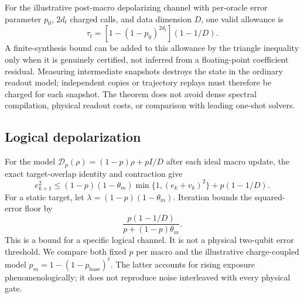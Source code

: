 \documentclass{ieeeaccess}
\begin{document}
For the illustrative post-macro depolarizing channel with per-oracle
error parameter $p_0$, $2d_t$ charged calls, and data dimension $D$,
one valid allowance is
\begin{equation}\label{eq:macroerrallowance}
\tau_t=\left[1-(1-p_0)^{2d_t}\right](1-1/D).
\end{equation}
A finite-synthesis bound can be added to this allowance by the triangle
inequality only when it is genuinely certified, not inferred from a
floating-point coefficient residual. Measuring intermediate snapshots
destroys the state in the ordinary readout model; independent copies
or trajectory replays must therefore be charged for each snapshot.
The theorem does not avoid dense spectral compilation, physical
readout costs, or comparison with leading one-shot solvers.

\subsection{Logical depolarization}
For the model $\mathcal D_p(\rho)=(1-p)\rho+pI/D$ after each ideal macro update, the exact target-overlap identity and contraction give
\begin{equation}\label{eq:noise}
e_{k+1}^2\le(1-p)(1-\theta_m)\min\{1,(e_k+v_k)^2\}+p(1-1/D).
\end{equation}
For a static target, let $\lambda=(1-p)(1-\theta_m)$. Iteration bounds the squared-error floor by
\begin{equation}\label{eq:floor}
\frac{p(1-1/D)}{p+(1-p)\theta_m}.
\end{equation}
This is a bound for a specific logical channel. It is not a physical two-qubit error threshold. We compare both fixed $p$ per macro and the illustrative charge-coupled model $p_m=1-(1-p_{\mathrm{base}})^\ell$. The latter accounts for rising exposure phenomenologically; it does not reproduce noise interleaved with every physical gate.
\end{document}
